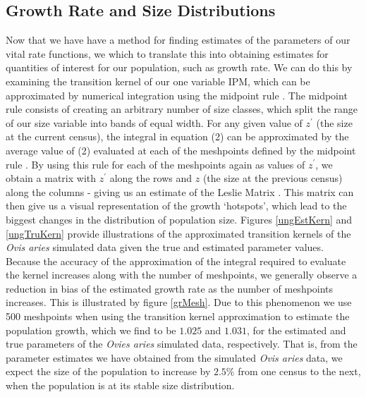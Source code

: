 \documentclass[a4paper,12pt]{article}
\begin{document}
\subsection{Growth Rate and Size Distributions}
Now that we have have a method for finding estimates of the parameters of our vital rate functions, we which to translate this into obtaining estimates for quantities of interest for our population, such as growth rate. We can do this by examining the transition kernel of our one variable IPM, which can be approximated by numerical integration using the midpoint rule \citep{ellner2006}. The midpoint rule consists of creating an arbitrary number of size classes, which split the range of our size variable into bands of equal width. For any given value of $z^{'}$ (the size at the current census), the integral in equation (2) can be approximated by the average value of (2) evaluated at each of the meshpoints defined by the midpoint rule \citep{ellner2006}. By using this rule for each of the meshpoints again as values of $z^{'}$, we obtain a matrix with $z^{'}$ along the rows and $z$ (the size at the previous census) along the columns - giving us an estimate of the Leslie Matrix \cite{Leslie}. This matrix can then give us a visual representation of the growth `hotspots', which lead to the biggest changes in the distribution of population size. Figures \ref{ungEstKern} and \ref{ungTruKern} provide illustrations of the approximated transition kernels of the \textit{Ovis aries} simulated data given the true and estimated parameter values.\\

Because the accuracy of the approximation of the integral required to evaluate the kernel increases along with the number of meshpoints, we generally observe a reduction in bias of the estimated growth rate as the number of meshpoints increases. This is illustrated by figure \ref{grMesh}. Due to this phenomenon we use 500 meshpoints when using the transition kernel approximation to estimate the population growth, which we find to be $1.025$ and $1.031$, for the estimated and true parameters of the \textit{Ovies aries} simulated data, respectively. That is, from the parameter estimates we have obtained from the simulated \textit{Ovis aries} data, we expect the size of the population to increase by $2.5\%$ from one census to the next, when the population is at its stable size distribution.\\
\end{document}
